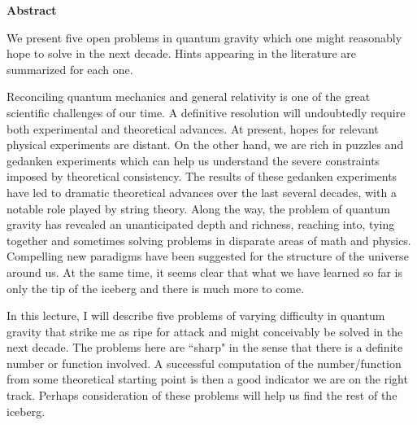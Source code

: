 \centerline{\bf Abstract}
We present five open problems in quantum gravity which one might reasonably hope to solve in the next decade. Hints appearing in the literature are summarized for each one.

\smallskip
\noindent
{}
\listtoc
\writetoc
{}
Reconciling quantum mechanics and general relativity is one of the great scientific challenges of our time. A definitive resolution will undoubtedly require both experimental and theoretical advances. At present, hopes for relevant physical experiments are distant. On the other hand, we are rich in puzzles and gedanken experiments which can help us understand the
severe constraints imposed by theoretical consistency. The results of these gedanken experiments have led to dramatic theoretical advances over the last several decades, with a notable role played by string theory.  Along the way, the problem of quantum gravity has revealed an unanticipated  depth  and richness, reaching into, tying together and sometimes solving problems in disparate areas of math and physics. Compelling new paradigms have been suggested for the structure of the universe around us.  At the same time, it seems clear that what we have learned so far is only the tip of the iceberg and there is much more to come. 


In this lecture, I will describe five problems of varying difficulty in quantum gravity that strike me as  ripe for attack and might conceivably be solved in the next decade.  The problems here are ``sharp" in the sense that there is a definite number or function involved. A successful computation of the number/function from some theoretical starting point is then a good indicator we are on the right track.  Perhaps consideration of these problems will help us find the rest of  the iceberg.  





